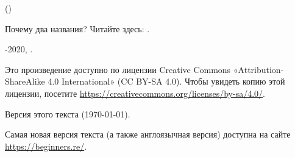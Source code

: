 ﻿\begin{titlepage}


\end{titlepage}

\newpage

\begin{center}
\vspace*{\fill}
{\LARGE \TitleMain}

\bigskip

{\large (\TitleAux)}

\bigskip
\bigskip
Почему два названия? Читайте здесь: .

\vspace*{\fill}

{\large \AUTHOR}

{\large \TT{\EMAILPRI}}
\vspace*{\fill}
\vfill

\ccbysa

-2020, \AUTHOR. 

Это произведение доступно по лицензии Creative Commons «Attribution-ShareAlike 4.0 International» (CC BY-SA 4.0).
Чтобы увидеть копию этой лицензии, посетите \url{https://creativecommons.org/licenses/by-sa/4.0/}.

Версия этого текста ({\large \today}).

Самая новая версия текста (а также англоязычная версия) доступна на сайте \url{https://beginners.re/}.

\end{center}
